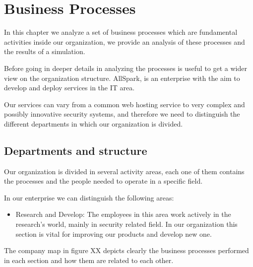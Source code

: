 \chapter{Business Processes}
In this chapter we analyze a set of business processes which are
fundamental activities inside our organization, we provide an analysis of
these processes and the results of a simulation.

Before going in deeper details in analyzing the processes is useful to get
a wider view on the organization structure.
AllSpark, is an enterprise with the aim to develop and deploy services in
the IT area.

Our services can vary from a common web hosting service to very complex and
possibly innovative security systems, and therefore we need to distinguish
the different departments in which our organization is divided.

\section{Departments and structure}
Our organization is divided in several activity areas, each one of them
contains the processes and the people needed to operate in a specific
field.

In our enterprise we can distinguish the following areas:
\begin{itemize}
\item{Research and Develop:} The employees in this area work actively in
the research's world, mainly in security related field. In our organization
this section is vital for improving our products and develop new one.
\end{itemize}

The company map in figure XX depicts clearly the business processes
performed in each section and how them are related to each other.


